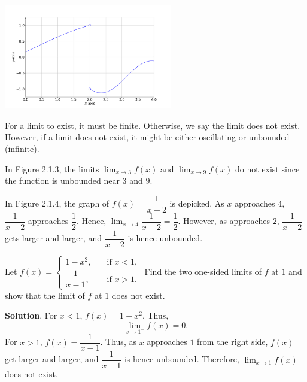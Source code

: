 \documentclass[11pt]{book}
\begin{document}
\begin{center}
    \includegraphics[width=0.55\textwidth]{jumpy.png}
\end{center}

For a limit to exist, it must be finite. Otherwise, we say the limit does not exist. However, if a limit does not exist, it might be either oscillating or unbounded (infinite).

\begin{example}
    In Figure 2.1.3, the limits $\displaystyle\lim_{x\to 3} f(x)$ and $\displaystyle\lim_{x\to 9} f(x)$ do not exist since the function is unbounded near $3$ and $9$.
\end{example}

\begin{example}
    In Figure 2.1.4, the graph of $f(x)=\dfrac{1}{x-2}$ is depicked. As $x$ approaches $4$, $\dfrac{1}{x-2}$ approaches $\dfrac{1}{2}$. Hence, $\displaystyle\lim_{x\to 4}\dfrac{1}{x-2}=\dfrac{1}{2}$. However, as approaches $2$, $\dfrac{1}{x-2}$ gets larger and larger, and $\dfrac{1}{x-2}$ is hence unbounded.
\end{example}

\begin{example}
    Let $\displaystyle f(x)=\left\{\begin{array}{ll}
        1-x^2, \quad & \text{if $x<1$},\\\dfrac{1}{x-1}, \quad & \text{if $x>1$}.
    \end{array}\right.$ Find the two one-sided limits of $f$ at $1$ and show that the limit of $f$ at $1$ does not exist.
\end{example}
\textbf{Solution}. For $x<1$, $f(x)=1-x^2$. Thus, $$\lim_{x\to1^-}f(x)=0.$$ For $x>1$, $f(x)=\dfrac{1}{x-1}$. Thus, as $x$ approaches $1$ from the right side, $f(x)$ get larger and larger, and $\dfrac{1}{x-1}$ is hence unbounded. Therefore, $\displaystyle\lim_{x\to 1}f(x)$ does not exist.
\end{document}
